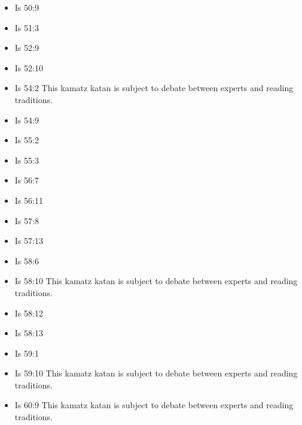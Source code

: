 \documentclass[14pt]{book}
\begin{document}
\begin{multicols}{2}
\begin{itemize}
				\item Is 50:9
				
				\item Is 51:3
				
				\item Is 52:9
				
				\item Is 52:10
				
				\item Is 54:2 This kamatz katan is subject to debate between experts and reading traditions.
				
				\item Is 54:9
				
				\item Is 55:2
				
				\item Is 55:3
				
				\item Is 56:7
				
				\item Is 56:11
				
				\item Is 57:8
				
				\item Is 57:13
				
				\item Is 58:6
				
				\item Is 58:10 This kamatz katan is subject to debate between experts and reading traditions.
				
				\item Is 58:12
				
				\item Is 58:13
				
				\item Is 59:1
				
				\item Is 59:10 This kamatz katan is subject to debate between experts and reading traditions.
				
				\item Is 60:9 This kamatz katan is subject to debate between experts and reading traditions.
				

\end{itemize}
\end{multicols}
\end{document}
